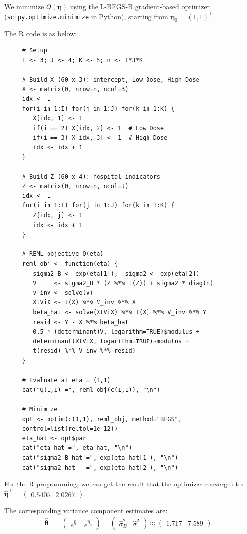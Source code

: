 \documentclass[letterpaper]{article}
\begin{document}
			We minimize $Q(\boldsymbol{\eta})$ using the L-BFGS-B gradient-based optimizer
			(\texttt{scipy.optimize.minimize} in Python), starting from
			$\boldsymbol{\eta}_0 = (1,1)^\top$.
			
			The R code is as below:
			
		\begin{lstlisting}
     # Setup
     I <- 3; J <- 4; K <- 5; n <- I*J*K
     
     # Build X (60 x 3): intercept, Low Dose, High Dose
     X <- matrix(0, nrow=n, ncol=3)
     idx <- 1
     for(i in 1:I) for(j in 1:J) for(k in 1:K) {
     	X[idx, 1] <- 1
     	if(i == 2) X[idx, 2] <- 1  # Low Dose
     	if(i == 3) X[idx, 3] <- 1  # High Dose
     	idx <- idx + 1
     }
     
     # Build Z (60 x 4): hospital indicators
     Z <- matrix(0, nrow=n, ncol=J)
     idx <- 1
     for(i in 1:I) for(j in 1:J) for(k in 1:K) {
     	Z[idx, j] <- 1
     	idx <- idx + 1
     }
     
     # REML objective Q(eta)
     reml_obj <- function(eta) {
     	sigma2_B <- exp(eta[1]);  sigma2 <- exp(eta[2])
     	V     <- sigma2_B * (Z %*% t(Z)) + sigma2 * diag(n)
     	V_inv <- solve(V)
     	XtViX <- t(X) %*% V_inv %*% X
     	beta_hat <- solve(XtViX) %*% t(X) %*% V_inv %*% Y
     	resid <- Y - X %*% beta_hat
     	0.5 * (determinant(V, logarithm=TRUE)$modulus +
     	determinant(XtViX, logarithm=TRUE)$modulus +
     	t(resid) %*% V_inv %*% resid)
     }
     
     # Evaluate at eta = (1,1)
     cat("Q(1,1) =", reml_obj(c(1,1)), "\n")
     
     # Minimize
     opt <- optim(c(1,1), reml_obj, method="BFGS",
     control=list(reltol=1e-12))
     eta_hat <- opt$par
     cat("eta_hat =", eta_hat, "\n")
     cat("sigma2_B_hat =", exp(eta_hat[1]), "\n")
     cat("sigma2_hat   =", exp(eta_hat[2]), "\n")
			\end{lstlisting}
			
			For the R programming, we can get the result that the optimizer converges to:
			$
			\hat{\boldsymbol{\eta}}^\top = \begin{pmatrix} 0.5405 & 2.0267 \end{pmatrix}.
			$
			
			The corresponding variance component estimates are:
			\[
			\hat{\boldsymbol{\theta}}^\top
			= \begin{pmatrix} e^{\hat{\eta}_1} & e^{\hat{\eta}_2} \end{pmatrix}
			= \begin{pmatrix} \hat{\sigma}^2_B & \hat{\sigma}^2 \end{pmatrix}
			\approx \begin{pmatrix} 1.717 & 7.589 \end{pmatrix}.
			\]
			
\end{document}
